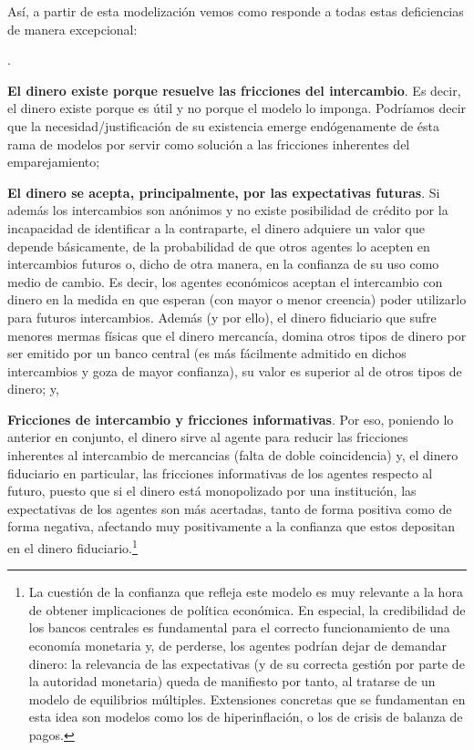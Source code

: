 \documentclass[10pt,a4paper]{article}
\newcounter{numitem}
\newenvironment{lnum}
      {\begin{list}{\arabic{numitem}.}{%
          \usecounter{numitem}%
          \setlength{\leftmargin}{1cm}%
          \setlength{\parskip}{3pt}%
          \setlength{\itemsep}{0pt}%
          \setlength{\parsep}{0pt}%
      }}
      {\end{list}}
\begin{document}
Así, a partir de esta modelización vemos como responde a todas estas deficiencias de manera excepcional:
\begin{lnum}
    \item \textbf{El dinero existe porque resuelve las fricciones del intercambio}. Es decir, el dinero existe porque es útil y no porque el modelo lo imponga. Podríamos decir que la necesidad/justificación de su existencia emerge endógenamente de ésta rama de modelos por servir como solución a las fricciones inherentes del emparejamiento;
    \item \textbf{El dinero se acepta, principalmente, por las expectativas futuras}. Si además los intercambios son anónimos y no existe posibilidad de crédito por la incapacidad de identificar a la contraparte, el dinero adquiere un valor que depende básicamente, de la probabilidad de que otros agentes lo acepten en intercambios futuros o, dicho de otra manera, en la confianza de su uso como medio de cambio. Es decir, los agentes económicos aceptan el intercambio con dinero en la medida en que esperan (con mayor o menor creencia) poder utilizarlo para futuros intercambios. Además (y por ello), el dinero fiduciario que sufre menores mermas físicas que el dinero mercancía, domina otros tipos de dinero por ser emitido por un banco central (es más fácilmente admitido en dichos intercambios y goza de mayor confianza), su valor es superior al de otros tipos de dinero; y,
    \item \textbf{Fricciones de intercambio y fricciones informativas}. Por eso, poniendo lo anterior en conjunto, el dinero sirve al agente para reducir las fricciones inherentes al intercambio de mercancias (falta de doble coincidencia) y, el dinero fiduciario en particular, las fricciones informativas de los agentes respecto al futuro, puesto que si el dinero está monopolizado por una institución, las expectativas de los agentes son más acertadas, tanto de forma positiva como de forma negativa, afectando muy positivamente a la confianza que estos depositan en el dinero fiduciario.\footnote{%
        La cuestión de la confianza que refleja este modelo es muy relevante a la hora de obtener implicaciones de política económica. En especial, la credibilidad de los bancos centrales es fundamental para el correcto funcionamiento de una economía monetaria y, de perderse, los agentes podrían dejar de demandar dinero: la relevancia de las expectativas (y de su correcta gestión por parte de la autoridad monetaria) queda de manifiesto por tanto, al tratarse de un modelo de equilibrios múltiples. Extensiones concretas que se fundamentan en esta idea son modelos como los de hiperinflación, o los de crisis de balanza de pagos.
    }
\end{lnum}
\end{document}
